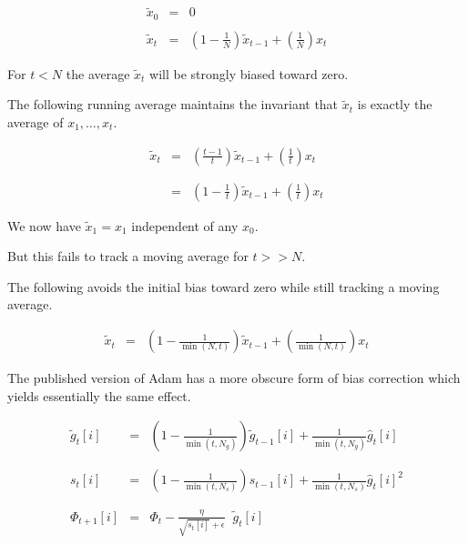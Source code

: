 {\begin{eqnarray*}
\tilde{x}_0 & = & 0 \\
\\
\tilde{x}_t & = & \left(1-\frac{1}{N}\right)\tilde{x}_{t-1} + \left(\frac{1}{N}\right)x_t
\end{eqnarray*}

\vfill
For $t < N$ the average $\tilde{x}_t$ will be strongly biased toward zero.


The following running average maintains the invariant that $\tilde{x}_t$ is exactly the average of $x_1,\ldots,x_t$.

\begin{eqnarray*}
\tilde{x}_t & = & \left(\frac{t-1}{t}\right)\tilde{x}_{t-1} + \left(\frac{1}{t}\right)x_t \\
\\
\\
& = & \left(1-\frac{1}{t}\right)\tilde{x}_{t-1} + \left(\frac{1}{t}\right)x_t
\end{eqnarray*}

\vfill
We now have $\tilde{x}_1 = x_1$ independent of any $x_0$.

\vfill
But this fails to track a moving average for $t >> N$.


The following avoids the initial bias toward zero while still tracking a moving average.

\begin{eqnarray*}
\tilde{x}_t & = & \left(1-\frac{1}{\min(N,t)}\right)\tilde{x}_{t-1} + \left(\frac{1}{\min(N,t)}\right)x_t
\end{eqnarray*}

\vfill
The published version of Adam has a more obscure form of bias correction which yields essentially the same effect.


\begin{eqnarray*}
  \tilde{g}_{t}[i] & = & \left(1-\frac{1}{\min(t,N_g)}\right)\tilde{g}_{t-1}[i] + \frac{1}{\min(t,N_g)} \hat{g}_t[i] \\
  \\
  \\
  s_{t}[i] & = & \left(1-\frac{1}{\min(t,N_s)}\right)s_{t-1}[i] + \frac{1}{\min(t,N_s)} \hat{g}_t[i]^2 \\
  \\
  \\
\Phi_{t+1}[i] & =  & \Phi_t - \frac{\eta}{\sqrt{s_{t}[i]} + \epsilon}\;\;\tilde{g}_{t}[i]
\end{eqnarray*}

}
